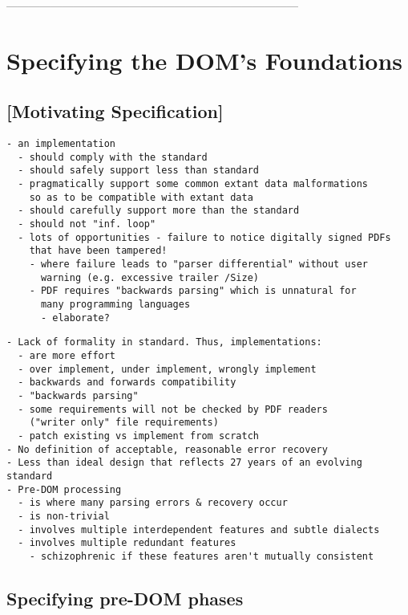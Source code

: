 ------------------------------------------------------------------------------
\section{Specifying the DOM's Foundations }
\label{sec:specifying}

\subsection{[Motivating Specification]}

\begin{lstlisting}[style=meta]
- an implementation
  - should comply with the standard
  - should safely support less than standard
  - pragmatically support some common extant data malformations
    so as to be compatible with extant data
  - should carefully support more than the standard
  - should not "inf. loop"
  - lots of opportunities - failure to notice digitally signed PDFs
    that have been tampered!
    - where failure leads to "parser differential" without user
      warning (e.g. excessive trailer /Size)
    - PDF requires "backwards parsing" which is unnatural for
      many programming languages
      - elaborate?
\end{lstlisting}

\begin{lstlisting}[style=meta]
- Lack of formality in standard. Thus, implementations:
  - are more effort
  - over implement, under implement, wrongly implement
  - backwards and forwards compatibility
  - "backwards parsing"
  - some requirements will not be checked by PDF readers
    ("writer only" file requirements) 
  - patch existing vs implement from scratch
- No definition of acceptable, reasonable error recovery
- Less than ideal design that reflects 27 years of an evolving standard
- Pre-DOM processing
  - is where many parsing errors & recovery occur
  - is non-trivial
  - involves multiple interdependent features and subtle dialects
  - involves multiple redundant features
    - schizophrenic if these features aren't mutually consistent
\end{lstlisting}

\subsection{Specifying pre-DOM phases}

\iffalse
\begin{code}
{-# LANGUAGE EmptyDataDecls, TypeOperators, LambdaCase #-}
module Spec where

import           Control.Monad
import           Data.Char
import           Data.Foldable(foldlM)
import qualified Data.Map as M
import           Data.Map(Map)

import           Types
import           Utils
import           Primitives
\end{code}
\fi

